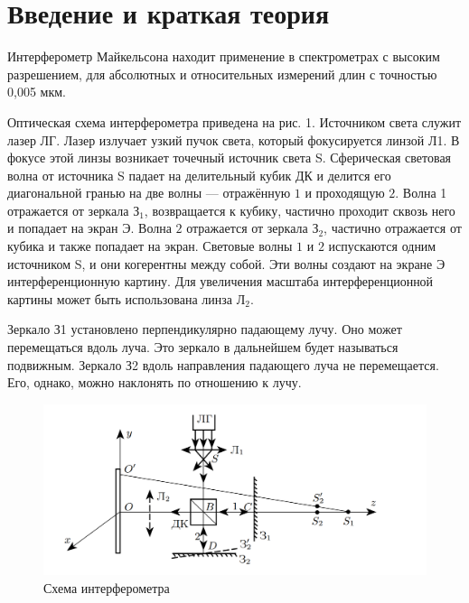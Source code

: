 
\section{Введение и краткая теория}

Интерферометр Майкельсона находит применение в спектрометрах с высоким разрешением, для абсолютных и относительных измерений длин с точностью 0,005 мкм. 

Оптическая схема интерферометра приведена на рис. 1. Источником света служит лазер $ЛГ$. Лазер излучает узкий пучок света, который фокусируется линзой Л1. В фокусе этой линзы возникает точечный
источник света S. Сферическая световая волна от источника S падает на делительный кубик ДК и делится его диагональной гранью на 
две волны — отражённую $1$ и проходящую $2$. Волна 1 отражается от
зеркала $З_1$, возвращается к кубику, частично проходит сквозь него и
попадает на экран $Э$. Волна $2$ отражается от зеркала $З_2$, частично отражается от кубика и также попадает на экран. Световые волны $1$ и $2$
испускаются одним источником S, и они когерентны между собой. Эти
волны создают на экране $Э$ интерференционную картину. Для увеличения масштаба интерференционной картины может быть использована
линза $Л_2$.

Зеркало З1 установлено перпендикулярно падающему лучу. Оно может перемещаться вдоль луча. Это зеркало в дальнейшем будет называться подвижным. Зеркало З2 вдоль направления падающего луча не
перемещается. Его, однако, можно наклонять по отношению к лучу.

\begin{figure}[h!]
    \centering
    \includegraphics[width=1.2\linewidth]{pics/scheme.png}
    \caption{Схема интерферометра}
    \label{}
\end{figure}

